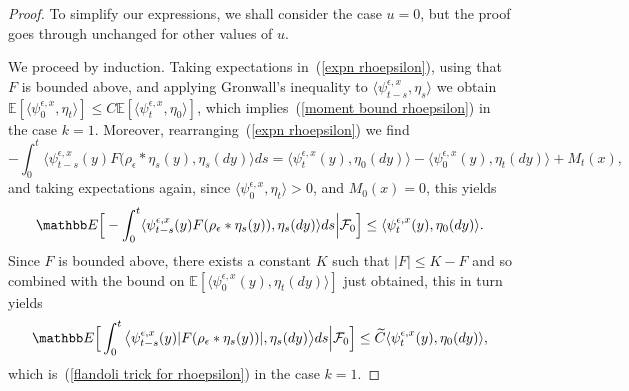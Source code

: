 \documentclass[EJP]{ejpecp} %
\newcommand{\IE}{\mathbb E}
\begin{document}
\begin{proof}
To simplify our expressions, we shall consider the case $u=0$, but
the proof goes through unchanged for other values of $u$.

We proceed by induction. 
Taking expectations in~(\ref{expn rhoepsilon}), using that $F$ is bounded above, and 
applying Gronwall's inequality to 
$\langle\psi^{\epsilon,x}_{t-s}, \eta_s\rangle$ 
we obtain 
$\IE[\langle \psi_0^{\epsilon,x},\eta_t\rangle] \le C \IE[\langle \psi_t^{\epsilon,x},\eta_0\rangle]$,
which implies~(\ref{moment bound rhoepsilon}) in the case $k=1$.
Moreover, rearranging~(\ref{expn rhoepsilon}) we find 
\begin{equation}
-\int_0^t\big\langle\psi^{\epsilon,x}_{t-s}(y)
F(\rho_\epsilon*\eta_s(y), \eta_s(dy)\big\rangle ds
=\langle\psi^{\epsilon,x}_t(y),\eta_0(dy)\rangle
-\langle \psi^{\epsilon,x}_0(y),\eta_t(dy)\rangle +M_t(x),
\end{equation} 
and taking expectations again, 
since $\langle\psi^{\epsilon,x}_0,\eta_t\rangle>0$, and $M_0(x)=0$,
this yields 
$$\IE\Big[-\int_0^t\langle\psi^{\epsilon,x}_{t-s}(y)F(\rho_\epsilon*\eta_s(y)), 
\eta_s(dy)\rangle ds\Big|{\cal F}_0\Big]
\leq \langle\psi^{\epsilon, x}_t(y),\eta_0(dy)\rangle.$$
Since $F$ is bounded above, there exists a constant $K$ such that $|F|\leq K-F$ and so 
combined with the bound on $\IE[\langle\psi^{\epsilon, x}_0(y),\eta_t(dy)\rangle]$ just
obtained, this in turn yields 
$$\IE\Big[\int_0^t\big\langle\psi^{\epsilon,x}_{t-s}(y)
|F(\rho_\epsilon*\eta_s(y))|, 
\eta_s(dy)\big\rangle ds\Big|{\cal F}_0\Big]\leq 
\widetilde{C}\langle\psi^{\epsilon, x}_t(y),\eta_0(dy)\rangle,$$
which is~(\ref{flandoli trick for rhoepsilon})
in the case $k=1$.


\end{proof}
\end{document}
